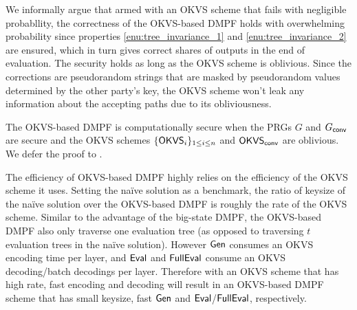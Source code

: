  

We informally argue that armed with an OKVS scheme that fails with negligible probabllity, the correctness of the OKVS-based DMPF holds with overwhelming probability since properties \ref{enu:tree_invariance_1} and \ref{enu:tree_invariance_2} are ensured, which in turn gives correct shares of outputs in the end of evaluation. The security holds as long as the OKVS scheme is oblivious. Since the corrections are pseudorandom strings that are masked by pseudorandom values determined by the other party's key, the OKVS scheme won't leak any information about the accepting paths due to its obliviousness. 

The OKVS-based DMPF is computationally secure when the PRGs $G$ and $G_{\sf conv}$ are secure and the OKVS schemes $\{{\sf OKVS}_i\}_{1\le i\le n}$ and ${\sf OKVS}_{\sf conv}$ are oblivious. We defer the proof to . 

The efficiency of OKVS-based DMPF highly relies on the efficiency of the OKVS scheme it uses. Setting the na\"ive solution as a benchmark, the ratio of keysize of the na\"ive solution over the OKVS-based DMPF is roughly the rate of the OKVS scheme. Similar to the advantage of the big-state DMPF, the OKVS-based DMPF also only traverse one evaluation tree (as opposed to traversing $t$ evaluation trees in the na\"ive solution). However ${\sf Gen}$ consumes an OKVS encoding time per layer, and ${\sf Eval}$ and ${\sf FullEval}$ consume an OKVS decoding/batch decodings per layer. Therefore with an OKVS scheme that has high rate, fast encoding and decoding will result in an OKVS-based DMPF scheme that has small keysize, fast ${\sf Gen}$ and ${\sf Eval}$/${\sf FullEval}$, respectively. 

